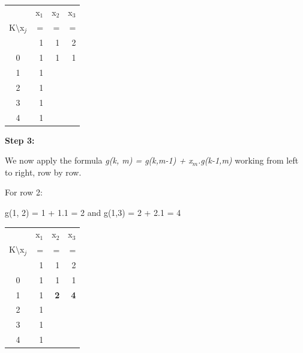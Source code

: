 \documentclass[12pt,fleqn]{report}
\begin{document}
\begin{center}
\begin{tabular}{|| c |r  r r|| }
\hline
                  & \multicolumn{1}{c}{x$_1$}
                  & \multicolumn{1}{c}{x$_2$}
                  & \multicolumn{1}{c||}{x$_3$}\\

K$\setminus$x$_j$ & =      & =      & =    \\
                  & 1      & 1      & 2     \\
\hline
0                 & 1      &  1     &  1     \\
1                 & 1      &        &       \\
2                 & 1      &        &       \\
3                 & 1      &        &       \\
4                 & 1      &        &       \\
\hline
\end{tabular}
\end{center}

\noindent
{\bf Step 3:}

We now apply the formula 
{\em g(k, m) = g(k,m-1) + x$_m$.g(k-1,m)}
working from left to right, row by row.

For row 2:

g(1, 2) = 1 + 1.1 = 2 and g(1,3) = 2 + 2.1 = 4

\begin{center}
\begin{tabular}{|| c |r  r r|| }
\hline
                  & \multicolumn{1}{c}{x$_1$}
                  & \multicolumn{1}{c}{x$_2$}
                  & \multicolumn{1}{c||}{x$_3$}\\

K$\setminus$x$_j$ & =      & =      & =    \\
                  & 1      & 1      & 2     \\
\hline
0                 & 1      &  1     &  1     \\
1                 & 1      &  {\bf 2}      & {\bf 4}  \\
2                 & 1      &        &       \\
3                 & 1      &        &       \\
4                 & 1      &        &       \\
\hline
\end{tabular}
\end{center}
\end{document}
